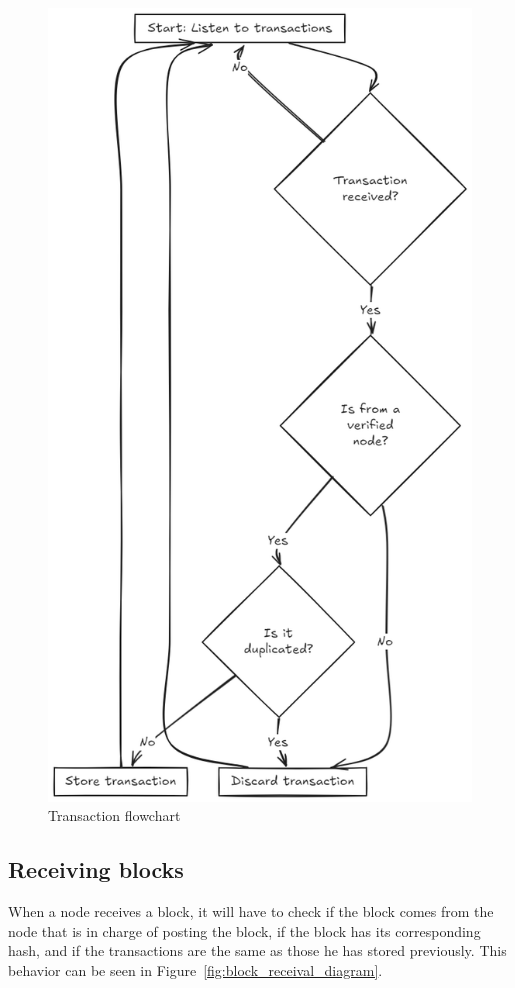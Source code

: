 \documentclass[twocolumn]{article} %
\begin{document}
\begin{figure}[h] %
    \centering
    \includegraphics[width=0.94\columnwidth]{Images/transactions_diagramV2.png}
    \caption{Transaction flowchart} 
    \label{fig:transactions_diagram}
\end{figure}
\newpage

\subsection{Receiving blocks}
When a node receives a block, it will have to check if the block comes from the node that is in charge of posting the block, if the block has its corresponding hash, and if the transactions are the same as those he has stored previously. This behavior can be seen in Figure~\ref{fig:block_receival_diagram}.
\end{document}
